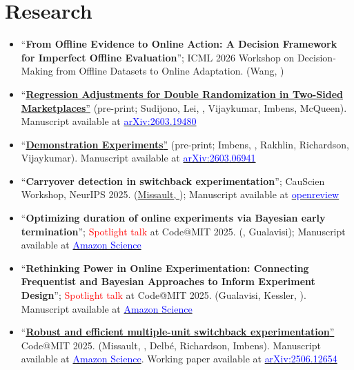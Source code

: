 \section*{Research}
\begin{itemize}
	\item ``\textbf{From Offline Evidence to Online Action: A Decision Framework for Imperfect Offline Evaluation}''; ICML 2026 Workshop on Decision-Making from Offline Datasets to Online Adaptation. (Wang, \mm)
	\item ``\href{https://arxiv.org/abs/2603.19480}{{\textbf{Regression Adjustments for Double Randomization in Two-Sided Marketplaces}}''} (pre-print; Sudijono, Lei, \mm, Vijaykumar, Imbens, McQueen). Manuscript available at \href{https://arxiv.org/abs/2603.19480}{\textcolor{blue}{arXiv:2603.19480}}
	\item ``\href{https://arxiv.org/abs/2603.06941}{{\textbf{Demonstration Experiments}}''} (pre-print; Imbens, \mm, Rakhlin, Richardson, Vijaykumar). Manuscript available at \href{https://arxiv.org/abs/2603.06941}{\textcolor{blue}{arXiv:2603.06941}}
	\item ``\textbf{Carryover detection in switchback experimentation}''; CauScien Workshop, NeurIPS 2025. (\href{https://openreview.net/pdf?id=fyfkP1TOKW}{Missault, \mm}); Manuscript available at \href{https://openreview.net/pdf?id=fyfkP1TOKW}{\textcolor{blue}{openreview}}
	\item ``\textbf{Optimizing duration of online experiments via Bayesian early termination}''; \textcolor{red}{Spotlight talk} at Code@MIT 2025. (\mm, Gualavisi); Manuscript available at \href{https://www.amazon.science/publications/optimizing-duration-of-online-experiments-via-bayesian-early-termination}{\textcolor{blue}{Amazon Science}}
	\item ``\textbf{Rethinking Power in Online Experimentation: Connecting Frequentist and Bayesian Approaches to Inform Experiment Design}''; \textcolor{red}{Spotlight talk} at Code@MIT 2025. (Gualavisi, Kessler, \mm). Manuscript available at \href{https://www.amazon.science/publications/statistical-power-calculations-revisited-incorporating-beliefs-about-effect-sizes}{\textcolor{blue}{Amazon Science}}
	\item ``\href{https://arxiv.org/abs/2506.12654}{{\textbf{Robust and efficient multiple-unit switchback experimentation}}''} Code@MIT 2025. (Missault, \mm, Delb\'{e}, Richardson, Imbens). Manuscript available at \href{https://www.amazon.science/publications/regular-balanced-switchback-designs-for-robust-multi-unit-online-experimentation}{\textcolor{blue}{Amazon Science}}. Working paper available at \href{https://arxiv.org/html/2506.12654}{\textcolor{blue}{arXiv:2506.12654}}

\end{itemize}
